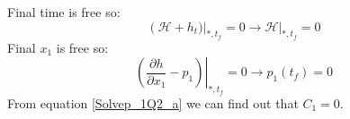 Final time is free so:
$$\left(\mathcal{H} + h_t)\right \vert_{*, t_f} = 0 \to \mathcal{H} \vert_{*, t_f} = 0 $$
Final $x_1$ is free so:
\begin{equation}\label{Solvep_1Q2_a}
	\left.(\dfrac{\partial h}{\partial x_1} - p_1) \right \vert_{*, t_f} = 0 \to p_1(t_f) = 0
\end{equation}
From equation \ref{Solvep_1Q2_a} we can find out that $C_1 = 0$.
